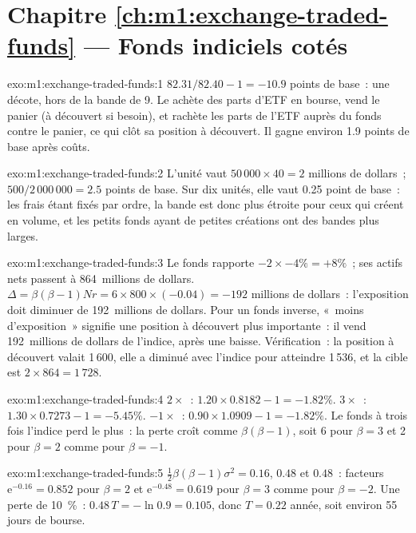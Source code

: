 \section*{Chapitre \ref{ch:m1:exchange-traded-funds} --- Fonds indiciels cotés}

\begin{solution}{exo:m1:exchange-traded-funds:1}
$82.31/82.40 - 1 = -10.9$ points de base~: une décote, hors de la bande de 9.
Le  achète des parts d'ETF en bourse, vend le panier
(à découvert si besoin), et rachète les parts de l'ETF auprès du fonds contre le panier,
ce qui clôt sa position à découvert. Il gagne environ 1.9 points de base après coûts.
\end{solution}

\begin{solution}{exo:m1:exchange-traded-funds:2}
L'unité vaut $50\,000 \times 40 = 2$ millions de dollars~; $500/2\,000\,000 = 2.5$
points de base. Sur dix unités, elle vaut 0.25 point de base~: les frais étant fixés
par ordre, la bande est donc plus étroite pour ceux qui créent en volume, et les petits fonds
ayant de petites créations ont des bandes plus larges.
\end{solution}

\begin{solution}{exo:m1:exchange-traded-funds:3}
Le fonds rapporte $-2 \times -4\% = +8\%$~; ses actifs nets passent à 864~millions de dollars.
$\Delta = \beta(\beta-1)Nr = 6 \times 800 \times (-0.04) = -192$ millions de dollars~:
l'exposition doit diminuer de 192~millions de dollars. Pour un fonds inverse, «~moins d'exposition~»
signifie une position à découvert plus importante~: il vend 192~millions de dollars de l'indice, après une baisse. Vérification~:
la position à découvert valait 1\,600, elle a diminué avec l'indice pour atteindre 1\,536, et la cible est $2
\times 864 = 1\,728$.
\end{solution}

\begin{solution}{exo:m1:exchange-traded-funds:4}
$2\times$~: $1.20 \times 0.8182 - 1 = -1.82\%$. $3\times$~: $1.30 \times 0.7273
- 1 = -5.45\%$. $-1\times$~: $0.90 \times 1.0909 - 1 = -1.82\%$. Le
fonds à trois fois l'indice perd le plus~: la perte croît comme $\beta(\beta-1)$, soit
6 pour $\beta = 3$ et 2 pour $\beta = 2$ comme pour $\beta = -1$.
\end{solution}

\begin{solution}{exo:m1:exchange-traded-funds:5}
$\tfrac12\beta(\beta-1)\sigma^2 = 0.16$, $0.48$ et $0.48$~: facteurs
$\mathrm{e}^{-0.16} = 0.852$ pour $\beta = 2$ et $\mathrm{e}^{-0.48} = 0.619$
pour $\beta = 3$ comme pour $\beta = -2$. Une perte de 10~\%~: $0.48\,T = -\ln 0.9 =
0.105$, donc $T = 0.22$ année, soit environ 55 jours de bourse.
\end{solution}

